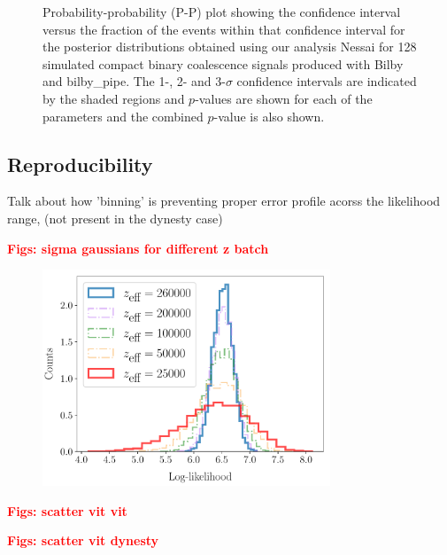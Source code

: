 \documentclass[aps,superscriptaddress,twocolumn,nopreprintnumbers,floatfix,groupedaddress]{revtex4-1}
\newcommand{\bilby}{{\sc Bilby}\xspace}
\newcommand{\nessai}{{\sc Nessai}\xspace}
\newcommand{\bilbypipe}{{\sc bilby\_pipe}\xspace}
\newcommand{\dynesty}{{\sc dynesty}\xspace}
\newcommand{\figwidth}{8.6cm}
\begin{document}
\begin{figure}
	\caption{Probability-probability (P-P) plot showing the confidence interval versus the fraction of the events within that confidence interval for the posterior distributions obtained using our analysis \nessai for 128 simulated compact binary coalescence signals produced with \bilby and \bilbypipe. The 1-, 2- and 3-$\sigma$ confidence intervals are indicated by the shaded regions and $p$-values are shown for each of the parameters and the combined $p$-value is also shown.}
	\label{fig:sel_consist}
\end{figure}


\subsection{Reproducibility}

Talk about how 'binning' is preventing proper error profile acorss the likelihood range, (not present in the \dynesty case)

\textbf{\textcolor{red}{Figs: sigma gaussians for different z batch}}

\begin{figure}
	\centering
	\includegraphics[width=\figwidth]{figs/hists_rect.pdf}
	\caption{}
	\label{fig:hists}
\end{figure}



\textbf{\textcolor{red}{Figs: scatter vit vit}}

\textbf{\textcolor{red}{Figs: scatter vit dynesty}}
\end{document}
